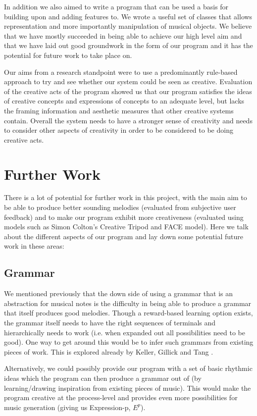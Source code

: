 \documentclass[pdftex,12pt,a4paper]{report}
\begin{document}
In addition we also aimed to write a program that can be used a basis for building upon and adding features to. We wrote a useful set of classes that allows representation and more importantly manipulation of musical objects. We believe that we have mostly succeeded in being able to achieve our high level aim and that we have laid out good groundwork in the form of our program and it has the potential for future work to take place on.

Our aims from a research standpoint were to use a predominantly rule-based approach to try and see whether our system could be seen as creative. Evaluation of the creative acts of the program showed us that our program satisfies the ideas of creative concepts and expressions of concepts to an adequate level, but lacks the framing information and aesthetic measures that other creative systems contain. Overall the system needs to have a stronger sense of creativity and needs to consider other aspects of creativity in order to be considered to be doing creative acts.


\section{Further Work}
There is a lot of potential for further work in this project, with the main aim to be able to produce better sounding melodies (evaluated from subjective user feedback) and to make our program exhibit more creativeness (evaluated using models such as Simon Colton's Creative Tripod and FACE model). Here we talk about the different aspects of our program and lay down some potential future work in these areas:

\subsection{Grammar}
We mentioned previously that the down side of using a grammar that is an abstraction for musical notes is the difficulty in being able to produce a grammar that itself produces good melodies. Though a reward-based learning option exists, the grammar itself needs to have the right sequences of terminals and hierarchically needs to work (i.e. when expanded out all possibilities need to be good). One way to get around this would be to infer such grammars from existing pieces of work. This is explored already by Keller, Gillick and Tang \cite{kellergillick09}. 

Alternatively, we could possibly provide our program with a set of basic rhythmic ideas which the program can then produce a grammar out of (by learning/drawing inspiration from existing pieces of music). This would make the program creative at the process-level and provides even more possibilities for music generation (giving us Expression-p, $E^{p}$).
\end{document}
